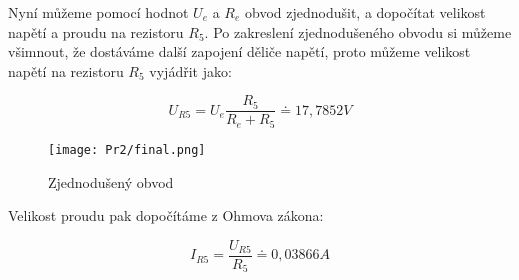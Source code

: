 Nyní můžeme pomocí hodnot $U_e$ a $R_e$ obvod zjednodušit, a dopočítat velikost napětí a proudu na rezistoru $R_5$. Po zakreslení zjednodušeného obvodu si můžeme všimnout, že dostáváme další zapojení děliče napětí, proto můžeme velikost napětí na rezistoru $R_5$ vyjádřit jako:

$$ U_{R5} = U_e \frac{R_5}{R_e + R_5} \doteq 17,7852 V $$

\begin{figure}[H]
\texttt{[image: Pr2/final.png]}
\centering
\caption{Zjednodušený obvod}
\end{figure}

Velikost proudu pak dopočítáme z Ohmova zákona:

$$ I_{R5} = \frac{U_{R5}}{R_5} \doteq 0,03866 A $$
